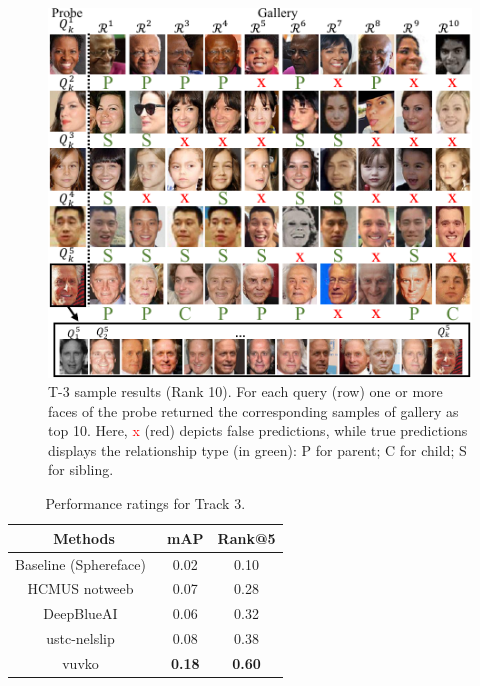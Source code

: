 \documentclass[letterpaper, 10 pt, conference]{ieeeconf}  %
\begin{document}
\begin{figure}[t!]
    \centering
    \includegraphics[width = .85\linewidth]{figures/track3-samples-crop.pdf}
    \caption{T-3 sample results (Rank 10). For each query (row) one or more faces of the probe returned the corresponding samples of gallery as top 10. Here, \textcolor{red}{x} (red) depicts false predictions, while true predictions displays the relationship type (in green): \textcolor{ao(english)}{P} for parent; \textcolor{ao(english)}{C} for child; \textcolor{ao(english)}{S} for sibling.}
    \label{fig:track3:montage}
    \vspace{-5mm}
\end{figure}
\begin{table}[b!]
	\centering
	\caption{Performance ratings for Track 3.}
	\begin{tabular}{c|cc} 
	      \textbf{Methods}  &\textbf{mAP} & \textbf{Rank@5} \\ \hline %
		  Baseline (Sphereface)~\cite{Liu_2017_CVPR} & 0.02 & 0.10	\\
		  HCMUS notweeb~\cite{id9} & 0.07 & 0.28	\\
		  DeepBlueAI~\cite{id3} & 0.06 & 0.32	\\
		  ustc-nelslip~\cite{id8} & 0.08 & 0.38	\\
		  vuvko~\cite{id4} & \textbf{0.18} & \textbf{0.60}	\\
	\end{tabular}
	\label{tbl:t3:benchmarks}
\end{table}
\end{document}
